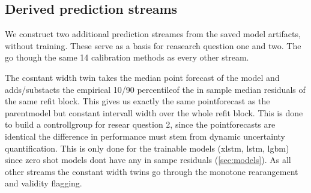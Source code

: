 \subsection{Derived prediction streams}
\label{sec:conformal:derived}

We construct two additional prediction streames from the saved model artifacts, without training. These serve as a basis for reasearch question one and two. The go though the same 14 calibration methods as every other stream.


The cosntant width twin takes the median point forecast of the model and adds/substacts the empirical 10/90 percentileof the in sample median residuals of the same refit block. This gives us exactly the same pointforecast as the parentmodel but constant intervall width over the whole refit block. This is done to build a controllgroup for resear question 2, since the pointforecasts are identical the difference in performance must stem from dynamic uncertainty quantification. This is only done for the trainable models (xlstm, lstm, lgbm) since zero shot models dont have any in sampe residuals (\cref{sec:models}). As all other streams the constant width twins go through the monotone rearangement and validity flagging. 

